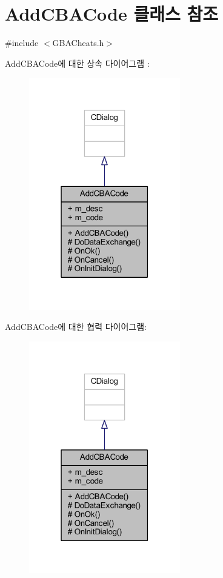 \hypertarget{class_add_c_b_a_code}{}\section{Add\+C\+B\+A\+Code 클래스 참조}
\label{class_add_c_b_a_code}


{\ttfamily \#include $<$G\+B\+A\+Cheats.\+h$>$}



Add\+C\+B\+A\+Code에 대한 상속 다이어그램 \+: \nopagebreak
\begin{figure}[H]
\begin{center}
\leavevmode
\includegraphics[width=187pt]{class_add_c_b_a_code__inherit__graph}
\end{center}
\end{figure}


Add\+C\+B\+A\+Code에 대한 협력 다이어그램\+:\nopagebreak
\begin{figure}[H]
\begin{center}
\leavevmode
\includegraphics[width=187pt]{class_add_c_b_a_code__coll__graph}
\end{center}
\end{figure}
